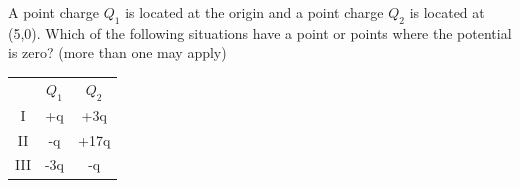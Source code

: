 
\begin{question}
A point charge $Q_1$ is located at the origin and a point charge $Q_2$ is located at (5,0). Which of the following situations have a point or points where the potential is zero? (more than one may apply)

\begin{center}
\begin{tabular}{ |c|c|c| } 
 \hline
       & $Q_1$ & $Q_2$ \\ 
 I      & +q  & +3q  \\ 
 II     & -q  & +17q \\ 
 III    & -3q & -q   \\ 
 \hline
\end{tabular}
\end{center}

\end{question}


